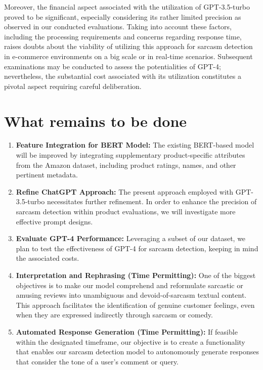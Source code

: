 \documentclass[10pt,twocolumn,letterpaper]{article}
\begin{document}
Moreover, the financial aspect associated with the utilization of GPT-3.5-turbo proved to be significant, especially considering its rather limited precision as observed in our conducted evaluations.
Taking into account these factors, including the processing requirements and concerns regarding response time, raises doubts about the viability of utilizing this approach for sarcasm detection in e-commerce environments on a big scale or in real-time scenarios.
Subsequent examinations may be conducted to assess the potentialities of GPT-4; nevertheless, the substantial cost associated with its utilization constitutes a pivotal aspect requiring careful deliberation.


\section{What remains to be done}

\begin{enumerate}
    \item \textbf{Feature Integration for BERT Model:} The existing BERT-based model will be improved by integrating supplementary product-specific attributes from the Amazon dataset, including product ratings, names, and other pertinent metadata. 

    \item \textbf{Refine ChatGPT Approach:} The present approach employed with GPT-3.5-turbo necessitates further refinement. In order to enhance the precision of sarcasm detection within product evaluations, we will investigate more effective prompt designs.

    \item \textbf{Evaluate GPT-4 Performance:} Leveraging a subset of our dataset, we plan to test the effectiveness of GPT-4 for sarcasm detection, keeping in mind the associated costs.

    \item \textbf{Interpretation and Rephrasing (Time Permitting):} One of the biggest objectives is to make our model comprehend and reformulate sarcastic or amusing reviews into unambiguous and devoid-of-sarcasm textual content. This approach facilitates the identification of genuine customer feelings, even when they are expressed indirectly through sarcasm or comedy.

    \item \textbf{Automated Response Generation (Time Permitting):} If feasible within the designated timeframe, our objective is to create a functionality that enables our sarcasm detection model to autonomously generate responses that consider the tone of a user's comment or query.

\end{enumerate}



\nocite{*}
{\small


}
\end{document}
